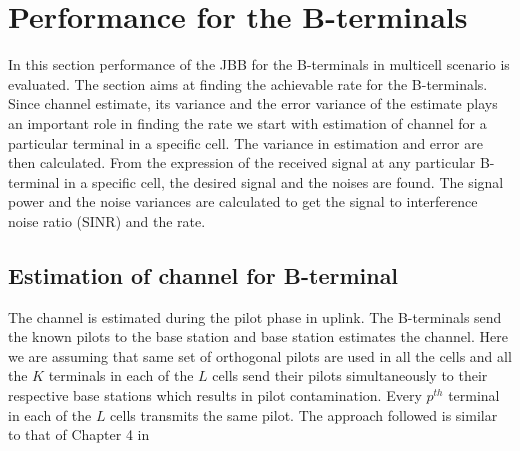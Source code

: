 \documentclass[10pt, a4paper, twoside,fleqn]{article}
\begin{document}
\section{Performance for the B-terminals}
	In this section performance of the JBB for the B-terminals in multicell scenario is evaluated. The section aims at finding the achievable rate for the B-terminals. Since channel estimate, its variance and the error variance of the estimate plays an important role in finding the rate we start with estimation of channel for a particular terminal in a specific cell. The variance in estimation and error are then calculated. From the expression of the received signal at any particular B-terminal in a specific cell, the desired signal and the noises are found. The signal power and the noise variances are calculated to get the signal to interference noise ratio (SINR) and the rate.

\subsection{Estimation of channel for B-terminal} \label{sec:btchesti}
	The channel is estimated during the pilot phase in uplink. The B-terminals send the known pilots to the base station and base station estimates the channel. Here we are assuming that same set of orthogonal pilots are used in all the cells and all the $K$ terminals in each of the $L$ cells send their pilots simultaneously to their respective base stations which results in pilot contamination. Every $p^{th}$ terminal in each of the $L$ cells transmits the same pilot. The approach followed is similar to that of Chapter 4 in \cite{bib:MassiveMimoBook}
\end{document}

